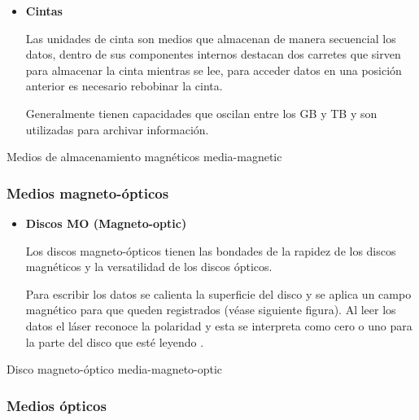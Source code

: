 \begin{itemize}
  \item \textbf{Cintas}

Las unidades de cinta son medios que almacenan de manera secuencial los datos, dentro de sus componentes internos destacan dos carretes que sirven para almacenar la cinta mientras se lee, para acceder datos en una posici\'{o}n anterior es necesario rebobinar la cinta.

Generalmente tienen capacidades que oscilan entre los \textsc{\gls{GB}} y \textsc{\gls{TB}}  \cite{_powervault_????} y son utilizadas para archivar informaci\'{o}n.

\end{itemize}

\diagramblock
{Medios de almacenamiento magn\'{e}ticos}
{media-magnetic}
{
 {
  
 }
}

      \subsubsection*{Medios magneto-\'{o}pticos}

\begin{itemize}

  \item \textbf{Discos MO (Magneto-optic)}

Los discos magneto-\'{o}pticos tienen las bondades de la rapidez de los discos magn\'{e}ticos y la versatilidad de los discos \'{o}pticos.

Para escribir los datos se calienta la superficie del disco y se aplica un campo magn\'{e}tico para que queden registrados (v\'{e}ase siguiente figura). Al leer los datos el l\'{a}ser reconoce la polaridad y esta se interpreta como cero o uno para la parte del disco que est\'{e} leyendo \cite{_illustrated_????}.

\end{itemize}

\diagramblock
{Disco magneto-\'{o}ptico}
{media-magneto-optic}
{
 {
  
 }
}

      \subsubsection*{Medios \'{o}pticos}

